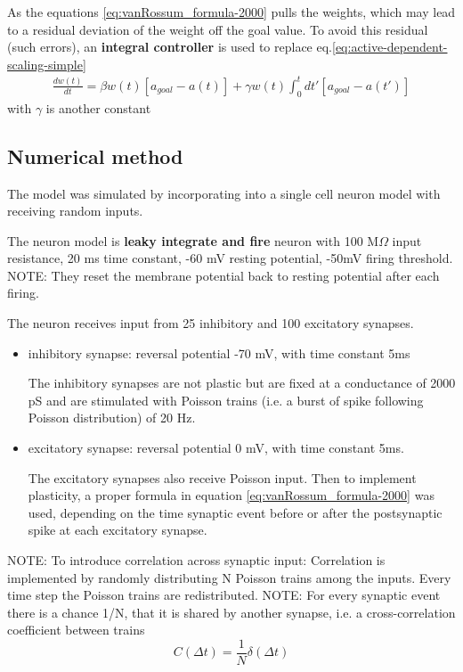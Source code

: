 As the equations \ref{eq:vanRossum_formula-2000} pulls the weights, which may
lead to a residual deviation of the weight off the goal value. To avoid this
residual (such errors), an {\bf integral controller} is used to replace
eq.\ref{eq:active-dependent-scaling-simple}
\begin{multline}
\label{eq:active-dependent-scaling-integral-controller}
\frac{dw(t)}{dt} =  \beta w(t) \left[ a_{goal} - a(t) \right] +
    \gamma w(t) \int^t_0 dt' \left[a_{goal} - a(t')\right] 
\end{multline}
with $\gamma$ is another constant


\subsection{Numerical method}

The model was simulated by incorporating into a single cell neuron model with
receiving random inputs. 

The neuron model is {\bf leaky integrate and fire} neuron with 100 M$\Omega$
input resistance, 20 ms time constant, -60 mV resting potential, -50mV firing
threshold. NOTE: They reset the membrane potential back to resting potential
after each firing.

The neuron receives input from 25 inhibitory and 100 excitatory synapses.
\begin{itemize}
  \item inhibitory synapse: reversal potential -70 mV, with time constant 5ms
  
The inhibitory synapses are not plastic but are fixed at a conductance
of 2000 pS and are stimulated with Poisson trains (i.e. a burst of spike
following Poisson distribution) of 20 Hz.

  \item excitatory synapse: reversal potential 0 mV, with time constant 5ms.
  
The excitatory synapses also receive Poisson input.
Then to implement plasticity, a proper formula in equation
\ref{eq:vanRossum_formula-2000} was used, depending on the time synaptic event
before or after the postsynaptic spike at each excitatory synapse.

\end{itemize}

NOTE: To introduce correlation across synaptic input: 
Correlation is implemented by randomly distributing N Poisson trains among the
inputs. Every time step the Poisson trains are redistributed.
NOTE: For every synaptic event there is a chance 1/N, that it is shared by
another synapse, i.e. a cross-correlation coefficient between trains
\begin{equation}
C(\Delta t) = \frac{1}{N}\delta (\Delta t)
\end{equation}




